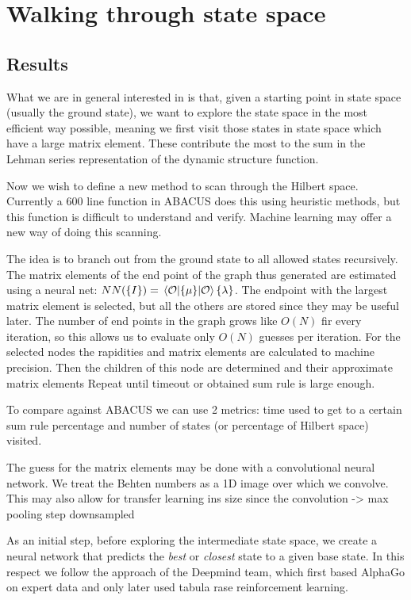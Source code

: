 \documentclass[11pt, a4paper]{report} %
\begin{document}
\section{Walking through state space}

\subsection{Results}

What we are in general interested in is that, given a starting point in state space (usually the ground state), we want to explore the state space in the most efficient way possible, meaning we first visit those states in state space which have a large matrix element. 
These contribute the most to the sum in the Lehman series representation of the dynamic structure function.





Now we wish to define a new method to scan through the Hilbert space.
Currently a 600 line function in ABACUS does this using heuristic methods, but this function is difficult to understand and verify.
Machine learning may offer a new way of doing this scanning.

The idea is to branch out from the ground state to all allowed states recursively.
The matrix elements of the end point of the graph thus generated are estimated using a neural net: $NN(\{I\}) = \expval{\{\mu\}}{\mathcal{O}}{\{\lambda\}}$.
The endpoint with the largest matrix element is selected, but all the others are stored since they may be useful later.
The number of end points in the graph grows like $O(N)$ fir every iteration, so this allows us to evaluate only $O(N)$ guesses per iteration.
For the selected nodes the rapidities and matrix elements are calculated to machine precision.
Then the children of this node are determined and their approximate matrix elements
Repeat until timeout or obtained sum rule is large enough.

To compare against ABACUS we can use 2 metrics:
time used to get to a certain sum rule percentage and number of states (or percentage of Hilbert space) visited.

The guess for the matrix elements may be done with a convolutional neural network.
We treat the Behten numbers as a 1D image over which we convolve.
This may also allow for transfer learning ins size since the convolution -> max pooling step downsampled



As an initial step, before exploring the intermediate state space, we create a neural network that predicts the \textit{best} or \textit{closest} state to a given base state.
In this respect we follow the approach of the Deepmind team, which first based AlphaGo on expert data and only later used tabula rase reinforcement learning.
\end{document}
